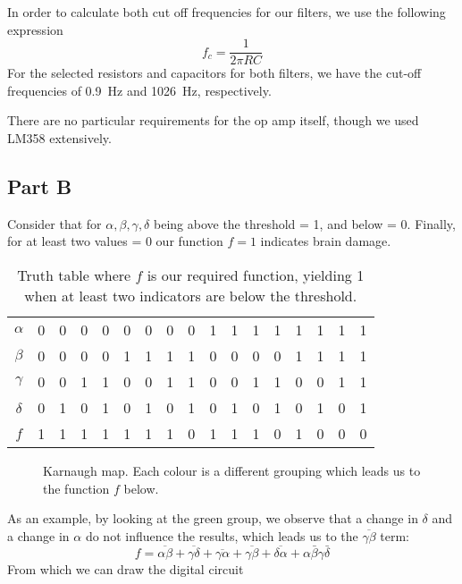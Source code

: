 In order to calculate both cut off frequencies for our filters, we use the following expression
\begin{equation}
    f_c = \frac{1}{2\pi RC}
\end{equation}
For the selected resistors and capacitors for both filters, we have the cut-off frequencies of \SI{0.9}{Hz} and \SI{1026}{Hz}, respectively.

There are no particular requirements for the op amp itself, though we used LM358 extensively.

\subsection*{Part B}

Consider that for $\alpha, \beta, \gamma, \delta$ being above the threshold = 1, and below = 0. Finally, for at least two values = 0 our function $f = 1$ indicates brain damage.


\begin{table}[h] \centering
    \begin{tabular}{c|cccccccccccccccc}
        $\alpha$ &0&0&0&0&0&0&0&0&1&1&1&1&1&1&1&1 \\
        $\beta $ &0&0&0&0&1&1&1&1&0&0&0&0&1&1&1&1 \\
        $\gamma$ &0&0&1&1&0&0&1&1&0&0&1&1&0&0&1&1 \\
        $\delta$ &0&1&0&1&0&1&0&1&0&1&0&1&0&1&0&1 \\
        $f$      &1&1&1&1&1&1&1&0&1&1&1&0&1&0&0&0
    \end{tabular}
    \caption{Truth table where $f$ is our required function, yielding 1 when at least two indicators are below the threshold.}
 \end{table}

\begin{figure}[h!] \centering
\begin{Karnaugh}
\end{Karnaugh}
\caption{Karnaugh map. Each colour is a different grouping which leads us to the function $f$ below.}
\end{figure}
As an example, by looking at the green group, we observe that a change in $\delta$ and a change in $\alpha$ do not influence the results, which leads us to the $\overline{\gamma\beta} $ term: 
\begin{equation}
    f = \overline{\alpha\beta} + \overline{\gamma\delta} + \overline{\gamma\alpha} +\overline{\gamma\beta} + \overline{\delta\alpha} + \alpha\bar{\beta}\gamma\bar{\delta}
\end{equation}
From which we can draw the digital circuit

